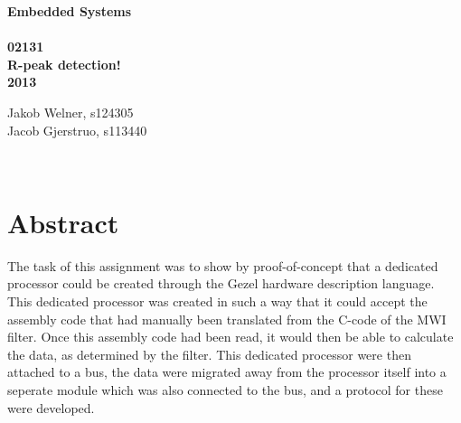 \documentclass[12pt,a4paper]{article}
\begin{document}
\begin{titlepage}
	\begin{center}
		\vspace*{13\baselineskip}
		\huge
		\bfseries
		Embedded Systems\\ 
		\ \\
		02131 \\[5\baselineskip]

		\normalfont
		\Large
		R-peak detection!\\	
		2013

		\small
		\vfill
	\end{center}	
	\begin{flushleft}
		Jakob Welner, s124305\\
	 	Jacob Gjerstruo, s113440\\
	\end{flushleft}
\end{titlepage}

\ \\
\section*{Abstract}
The task of this assignment was to show by proof-of-concept that a dedicated processor could be created through the Gezel hardware description language. This dedicated processor was created in such a way that it could accept the assembly code that had manually been translated from the C-code of the MWI filter. Once this assembly code had been read, it would then be able to calculate the data, as determined by the filter. This dedicated processor were then attached to a bus, the data were migrated away from the processor itself into a seperate module which was also connected to the bus, and a protocol for these were developed.

\thispagestyle{empty} 
\newpage

\tableofcontents
\thispagestyle{empty} 
\newpage

\setcounter{page}{1}

\ \\
\end{document}
